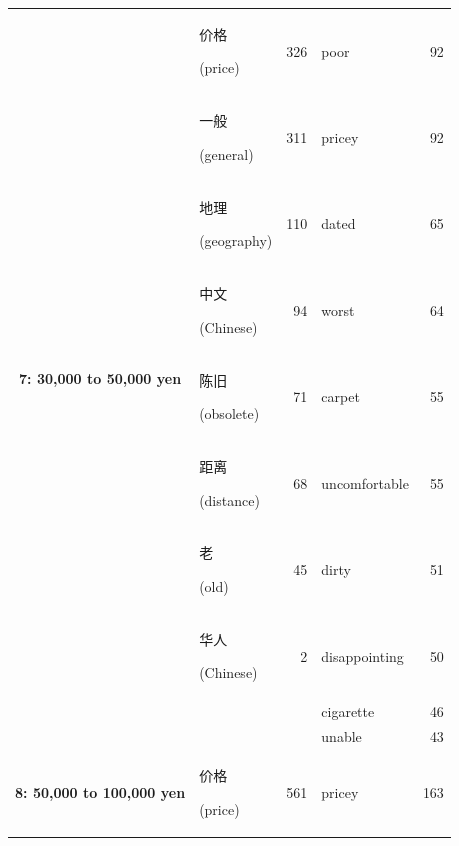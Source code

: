 \documentclass[smallextended,natbib]{svjour3}       %
\begin{document}
\begin{table}[ht]
{\begin{tabular}{|c|lr|lr|}
        \multirow{10}{*}{\textbf{7: 30,000 to 50,000 yen}}   & \begin{CJK}{UTF8}{gbsn}价格\end{CJK} (price)     & 326  & poor           & 92  \\  
                                                             & \begin{CJK}{UTF8}{gbsn}一般\end{CJK} (general)   & 311  & pricey         & 92  \\  
                                                             & \begin{CJK}{UTF8}{gbsn}地理\end{CJK} (geography) & 110  & dated          & 65  \\  
                                                             & \begin{CJK}{UTF8}{gbsn}中文\end{CJK} (Chinese)   & 94   & worst          & 64  \\  
                                                             & \begin{CJK}{UTF8}{gbsn}陈旧\end{CJK} (obsolete)  & 71   & carpet         & 55  \\  
                                                             & \begin{CJK}{UTF8}{gbsn}距离\end{CJK} (distance)  & 68   & uncomfortable  & 55  \\  
                                                             & \begin{CJK}{UTF8}{gbsn}老\end{CJK} (old)        & 45   & dirty          & 51  \\  
                                                             & \begin{CJK}{UTF8}{gbsn}华人\end{CJK} (Chinese)   & 2    & disappointing  & 50  \\  
                                                             &                                                &      & cigarette      & 46  \\  
                                                             &                                                &      & unable         & 43  \\ \hline
        \multirow{10}{*}{\textbf{8: 50,000 to 100,000 yen}} &
                                                               \begin{CJK}{UTF8}{gbsn}价格\end{CJK} (price)     & 561  & pricey         & 163 \\ 

\end{tabular}}
\end{table}
\end{document}
